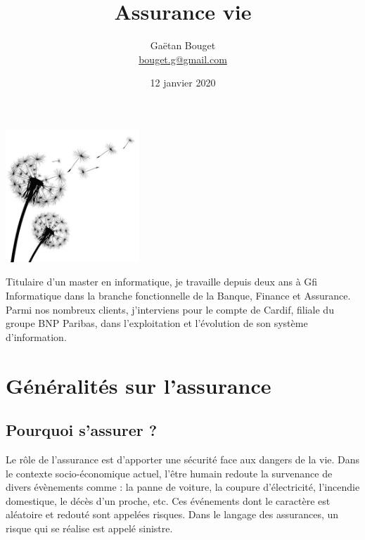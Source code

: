 \documentclass{article}
\title{Assurance vie}
\author{Gaëtan Bouget \\ \href{mailto:bouget.g@gmail.com}{bouget.g@gmail.com}}
\date{12 janvier 2020}
\begin{document}
\maketitle
\thispagestyle{empty}

\vspace{3cm}

\begin{center}
    \includegraphics[width=5cm]{dandelion.jpg}
\end{center}

\vspace{3cm}

Titulaire d'un master en informatique, je travaille depuis deux ans à Gfi Informatique dans la branche fonctionnelle de la Banque, Finance et Assurance. Parmi nos nombreux clients, j'interviens pour le compte de Cardif, filiale du groupe BNP Paribas, dans l'exploitation et l'évolution de son système d'information.

\newpage

\tableofcontents

\newpage

\section{Généralités sur l'assurance}

\subsection{Pourquoi s'assurer ?}
Le rôle de l'assurance est d'apporter une sécurité face aux dangers de la vie. Dans le contexte socio-économique actuel, l'être humain redoute la survenance de divers évènements comme : la panne de voiture, la coupure d'électricité, l'incendie domestique, le décès d'un proche, etc. Ces événements dont le caractère est aléatoire et redouté sont appelées risques. Dans le langage des assurances, un risque qui se réalise est appelé sinistre.
\end{document}
